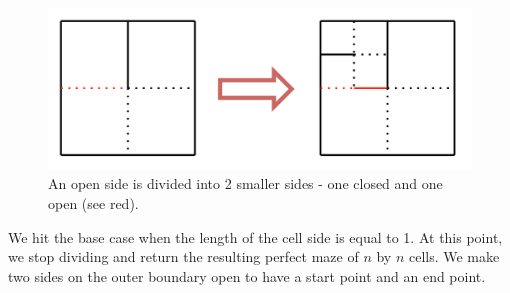 \documentclass[11pt, margin=1in]{article}
\begin{document}
\begin{figure}[H]
\begin{center}
\includegraphics[scale=0.7]{gen2.jpg}
\end{center}
\caption{An open side is divided into 2 smaller sides - one closed and one open (see red).}
\end{figure}

We hit the base case when the length of the cell side is equal to 1.  At this point, we stop dividing and return the resulting perfect maze of $n$ by $n$ cells.  We make two sides on the outer boundary open to have a start point and an end point.    
\end{document}
